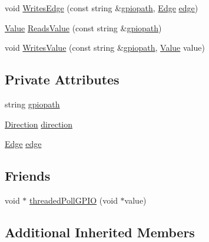 \begin{DoxyCompactItemize}
\item 
void \hyperlink{class_hardware_1_1_g_p_i_o_a99e41223fcd93f47f3acf4851fc32de2}{Writes\+Edge} (const string \&\hyperlink{class_hardware_1_1_g_p_i_o_ac47062ed6aba52b9e8506e1575bf5061}{gpiopath}, \hyperlink{class_hardware_1_1_g_p_i_o_a9a7595aabdac9aec75f22e8b86342162}{Edge} \hyperlink{class_hardware_1_1_g_p_i_o_adf15f74f053069029e99934e28c109e0}{edge})
\item 
\hyperlink{class_hardware_1_1_g_p_i_o_ad357201dc1ad13ad96ba1773108a5f6d}{Value} \hyperlink{class_hardware_1_1_g_p_i_o_a2af76b35edfeae57ee5393f8455e2522}{Reads\+Value} (const string \&\hyperlink{class_hardware_1_1_g_p_i_o_ac47062ed6aba52b9e8506e1575bf5061}{gpiopath})
\item 
void \hyperlink{class_hardware_1_1_g_p_i_o_a143da5d0e47450cd4080754d81026dc9}{Writes\+Value} (const string \&\hyperlink{class_hardware_1_1_g_p_i_o_ac47062ed6aba52b9e8506e1575bf5061}{gpiopath}, \hyperlink{class_hardware_1_1_g_p_i_o_ad357201dc1ad13ad96ba1773108a5f6d}{Value} value)
\end{DoxyCompactItemize}
\subsection*{Private Attributes}
\begin{DoxyCompactItemize}
\item 
string \hyperlink{class_hardware_1_1_g_p_i_o_ac47062ed6aba52b9e8506e1575bf5061}{gpiopath}
\item 
\hyperlink{class_hardware_1_1_g_p_i_o_a7507431d6341c146f22dcdb21b78ffd4}{Direction} \hyperlink{class_hardware_1_1_g_p_i_o_a77e93e4f6650507fdc4898d272d540e7}{direction}
\item 
\hyperlink{class_hardware_1_1_g_p_i_o_a9a7595aabdac9aec75f22e8b86342162}{Edge} \hyperlink{class_hardware_1_1_g_p_i_o_adf15f74f053069029e99934e28c109e0}{edge}
\end{DoxyCompactItemize}
\subsection*{Friends}
\begin{DoxyCompactItemize}
\item 
void $\ast$ \hyperlink{class_hardware_1_1_g_p_i_o_aac791b3d71615b988c52d994896fdbec}{threaded\+Poll\+G\+P\+I\+O} (void $\ast$value)
\end{DoxyCompactItemize}
\subsection*{Additional Inherited Members}


